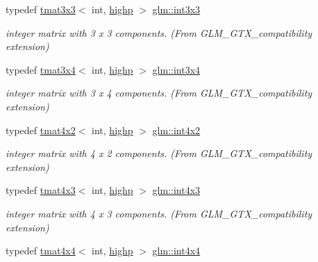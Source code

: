 \begin{DoxyCompactItemize}
typedef \mbox{\hyperlink{structglm_1_1tmat3x3}{tmat3x3}}$<$ int, \mbox{\hyperlink{namespaceglm_a0f04f086094c747d227af4425893f545ac6f7eab42eacbb10d59a58e95e362074}{highp}} $>$ \mbox{\hyperlink{group__gtx__compatibility_ga4eb54b9ea96f12c04faaf2ca7b7c8c70}{glm\+::int3x3}}
\begin{DoxyCompactList}\small\item\em integer matrix with 3 x 3 components. (From G\+L\+M\+\_\+\+G\+T\+X\+\_\+compatibility extension) \end{DoxyCompactList}\item 
typedef \mbox{\hyperlink{structglm_1_1tmat3x4}{tmat3x4}}$<$ int, \mbox{\hyperlink{namespaceglm_a0f04f086094c747d227af4425893f545ac6f7eab42eacbb10d59a58e95e362074}{highp}} $>$ \mbox{\hyperlink{group__gtx__compatibility_ga7500192cce87fb3a48f7119d6646af5a}{glm\+::int3x4}}
\begin{DoxyCompactList}\small\item\em integer matrix with 3 x 4 components. (From G\+L\+M\+\_\+\+G\+T\+X\+\_\+compatibility extension) \end{DoxyCompactList}\item 
typedef \mbox{\hyperlink{structglm_1_1tmat4x2}{tmat4x2}}$<$ int, \mbox{\hyperlink{namespaceglm_a0f04f086094c747d227af4425893f545ac6f7eab42eacbb10d59a58e95e362074}{highp}} $>$ \mbox{\hyperlink{group__gtx__compatibility_ga91c24f1a2df5d20ea98f97ec243782c3}{glm\+::int4x2}}
\begin{DoxyCompactList}\small\item\em integer matrix with 4 x 2 components. (From G\+L\+M\+\_\+\+G\+T\+X\+\_\+compatibility extension) \end{DoxyCompactList}\item 
typedef \mbox{\hyperlink{structglm_1_1tmat4x3}{tmat4x3}}$<$ int, \mbox{\hyperlink{namespaceglm_a0f04f086094c747d227af4425893f545ac6f7eab42eacbb10d59a58e95e362074}{highp}} $>$ \mbox{\hyperlink{group__gtx__compatibility_ga08b035f86b94428f5913e48a4a074e97}{glm\+::int4x3}}
\begin{DoxyCompactList}\small\item\em integer matrix with 4 x 3 components. (From G\+L\+M\+\_\+\+G\+T\+X\+\_\+compatibility extension) \end{DoxyCompactList}\item 
typedef \mbox{\hyperlink{structglm_1_1tmat4x4}{tmat4x4}}$<$ int, \mbox{\hyperlink{namespaceglm_a0f04f086094c747d227af4425893f545ac6f7eab42eacbb10d59a58e95e362074}{highp}} $>$ \mbox{\hyperlink{group__gtx__compatibility_ga1e72ab0f7e57aae3d07ef8880c11d8b7}{glm\+::int4x4}}

\end{DoxyCompactItemize}
